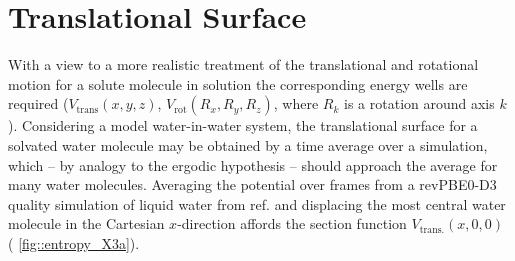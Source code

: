 \documentclass[../main.tex]{subfiles}
\begin{document}
\section{Translational Surface}
With a view to a more realistic treatment of the translational and rotational motion for a solute molecule in solution the corresponding energy wells are required ($V_\text{trans}(x, y, z)$, $V_\text{rot}(R_x, R_y, R_z)$, where $R_k$ is a rotation around axis $k$). Considering a model water-in-water system, the translational surface for a solvated water molecule may be obtained by a time average over a simulation, which -- by analogy to the ergodic hypothesis -- should approach the average for many water molecules. Averaging the potential over frames from a revPBE0-D3 quality simulation of liquid water from ref. \cite{Young2021GAP} and displacing the most central water molecule in the Cartesian $x$-direction affords the section function $V_\text{trans.}(x, 0, 0)$ (\figurename{ \ref{fig::entropy_X3a}}). 
\end{document}

